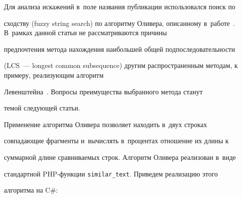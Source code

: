 \vspace*{-2pt}





  Для анализа искажений в~поле названия публикации использовался поиск по


сходству (fuzzy string search) по алгоритму Оливера, описанному в~работе~\cite{4-o}. В~рамках данной статьи не рассматриваются причины


предпочтения метода нахождения наибольшей общей подпоследовательности


(LCS~--- longest common subsequence) другим распространенным методам, к примеру, реализующим алгоритм


Левенштейна~\cite{5-o}. Вопросы преимущества выбранного метода станут


темой следующей статьи.





  Применение алгоритма Оливера позволяет находить в~двух строках


совпадающие фрагменты и~вычислять в~процентах отношение их длины к


суммарной длине сравниваемых строк. Алгоритм Оливера реализован в~виде


стандартной PHP-функ\-ции \verb"similar_text". Приведем реализацию этого


алгоритма на C\#:





\vspace*{-6pt}





